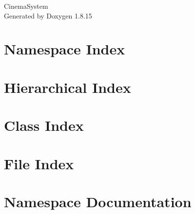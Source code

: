 \let\mypdfximage\pdfximage\def\pdfximage{\immediate\mypdfximage}\documentclass[twoside]{book}
\newcommand{\+}{\discretionary{\mbox{\scriptsize$\hookleftarrow$}}{}{}}
\newcommand{\clearemptydoublepage}{%
  \newpage{\pagestyle{empty}\cleardoublepage}%
}
\begin{document}
\hypersetup{pageanchor=false,
             bookmarksnumbered=true,
             pdfencoding=unicode
            }
\begin{titlepage}
\vspace*{7cm}
\begin{center}%
{\Large Cinema\+System }\\
\vspace*{1cm}
{\large Generated by Doxygen 1.8.15}\\
\end{center}
\end{titlepage}
\clearemptydoublepage
{}
\tableofcontents
\clearemptydoublepage
{}
\hypersetup{pageanchor=true}

\chapter{Namespace Index}

\chapter{Hierarchical Index}

\chapter{Class Index}

\chapter{File Index}

\chapter{Namespace Documentation}










\end{document}
